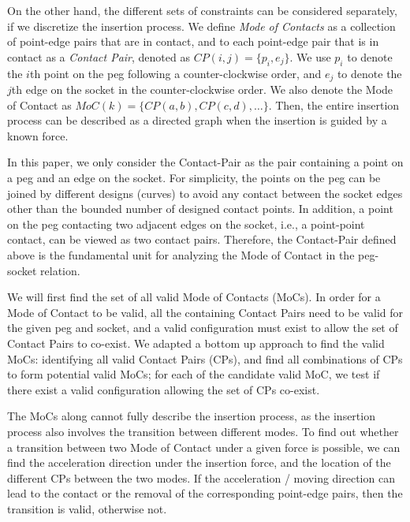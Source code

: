 \documentclass[11pt, twocolumn]{article}
\begin{document}
On the other hand, the different sets of constraints can be considered separately, if we discretize the insertion process. We define {\em Mode of Contacts} as a collection of point-edge pairs that are in contact, and to each point-edge pair that is in contact as a {\em Contact Pair}, denoted as $CP(i, j) = \{p_i, e_j\}$. We use $p_i$ to denote the $i$th point on the peg following a counter-clockwise order, and $e_j$ to denote the $j$th edge on the socket in the counter-clockwise order. We also denote the Mode of Contact as $MoC(k) = \{CP(a, b), CP(c, d), \ldots\}$. Then, the entire insertion process can be described as a directed graph when the insertion is guided by a known force. 

In this paper, we only consider the Contact-Pair as the pair containing a point on a peg and an edge on the socket. For simplicity, the points on the peg can be joined by different designs (curves) to avoid any contact between the socket edges other than the bounded number of designed contact points. In addition, a point on the peg contacting two adjacent edges on the socket, i.e., a point-point contact, can be viewed as two contact pairs. Therefore, the Contact-Pair defined above is the fundamental unit for analyzing the Mode of Contact in the peg-socket relation. 

We will first find the set of all valid Mode of Contacts (MoCs). In order for a Mode of Contact to be valid, all the containing Contact Pairs need to be valid for the given peg and socket, and a valid configuration must exist to allow the set of Contact Pairs to co-exist. We adapted a bottom up approach to find the valid MoCs: identifying all valid Contact Pairs (CPs), and find all combinations of CPs to form potential valid MoCs; for each of the candidate valid MoC, we test if there exist a valid configuration allowing the set of CPs co-exist. 


The MoCs along cannot fully describe the insertion process, as the insertion process also involves the transition between different modes. To find out whether a transition between two Mode of Contact under a given force is possible, we can find the acceleration direction under the insertion force, and the location of the different CPs between the two modes. If the acceleration / moving direction can lead to the contact or the removal of the corresponding point-edge pairs, then the transition is valid, otherwise not. 
\end{document}
